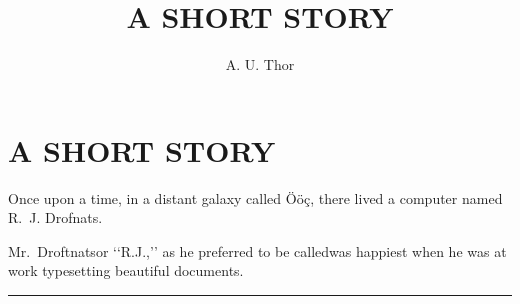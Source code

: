 \documentclass[a4paper,12pt]{article}
\begin{document}
\author{A. U. Thor}
\title{A SHORT STORY}
\maketitle
\section*{A SHORT STORY}
Once upon a time, in a distant galaxy called
       \"{O}\"{o}\c{c}, there lived a computer
       named R.~J. Drofnats.\par
Mr.~Droftnats\textemdash{}or \lq{}\lq{}R.J.,\rq{}\rq{} as he
       preferred to be called\textemdash{}was happiest
       when he was at work typesetting beautiful
       documents.\par
\bigskip
\hrule
\end{document}
